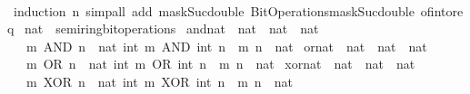 \begin{isabellebody}
%
\isadelimproof
\ \ %
\endisadelimproof
%
\isatagproof
{}\isamarkupfalse%
\ {\isacharparenleft}{\kern0pt}induction\ n{\isacharparenright}{\kern0pt}\ {\isacharparenleft}{\kern0pt}simp{\isacharunderscore}{\kern0pt}all\ add{\isacharcolon}{\kern0pt}\ mask{\isacharunderscore}{\kern0pt}Suc{\isacharunderscore}{\kern0pt}double\ Bit{\isacharunderscore}{\kern0pt}Operations{\isachardot}{\kern0pt}mask{\isacharunderscore}{\kern0pt}Suc{\isacharunderscore}{\kern0pt}double\ of{\isacharunderscore}{\kern0pt}int{\isacharunderscore}{\kern0pt}or{\isacharunderscore}{\kern0pt}eq{\isacharparenright}{\kern0pt}%
\endisatagproof
{\isafoldproof}%
%
\isadelimproof
\isanewline
%
\endisadelimproof
\isanewline
{}\isamarkupfalse%
%
\isadelimdocument
%
\endisadelimdocument
%
\isatagdocument
%
\isamarkuptrue%
%
\endisatagdocument
{\isafolddocument}%
%
\isadelimdocument
%
\endisadelimdocument
{}\isamarkupfalse%
\ nat\ {\isacharcolon}{\kern0pt}{\isacharcolon}{\kern0pt}\ semiring{\isacharunderscore}{\kern0pt}bit{\isacharunderscore}{\kern0pt}operations\isanewline
{}\isanewline
\isanewline
{}\isamarkupfalse%
\ and{\isacharunderscore}{\kern0pt}nat\ {\isacharcolon}{\kern0pt}{\isacharcolon}{\kern0pt}\ {\isacartoucheopen}nat\ {\isasymRightarrow}\ nat\ {\isasymRightarrow}\ nat{\isacartoucheclose}\isanewline
\ \ \ {\isacartoucheopen}m\ AND\ n\ {\isacharequal}{\kern0pt}\ nat\ {\isacharparenleft}{\kern0pt}int\ m\ AND\ int\ n{\isacharparenright}{\kern0pt}{\isacartoucheclose}\ \ m\ n\ {\isacharcolon}{\kern0pt}{\isacharcolon}{\kern0pt}\ nat\isanewline
\isanewline
{}\isamarkupfalse%
\ or{\isacharunderscore}{\kern0pt}nat\ {\isacharcolon}{\kern0pt}{\isacharcolon}{\kern0pt}\ {\isacartoucheopen}nat\ {\isasymRightarrow}\ nat\ {\isasymRightarrow}\ nat{\isacartoucheclose}\isanewline
\ \ \ {\isacartoucheopen}m\ OR\ n\ {\isacharequal}{\kern0pt}\ nat\ {\isacharparenleft}{\kern0pt}int\ m\ OR\ int\ n{\isacharparenright}{\kern0pt}{\isacartoucheclose}\ \ m\ n\ {\isacharcolon}{\kern0pt}{\isacharcolon}{\kern0pt}\ nat\isanewline
\isanewline
{}\isamarkupfalse%
\ xor{\isacharunderscore}{\kern0pt}nat\ {\isacharcolon}{\kern0pt}{\isacharcolon}{\kern0pt}\ {\isacartoucheopen}nat\ {\isasymRightarrow}\ nat\ {\isasymRightarrow}\ nat{\isacartoucheclose}\isanewline
\ \ \ {\isacartoucheopen}m\ XOR\ n\ {\isacharequal}{\kern0pt}\ nat\ {\isacharparenleft}{\kern0pt}int\ m\ XOR\ int\ n{\isacharparenright}{\kern0pt}{\isacartoucheclose}\ \ m\ n\ {\isacharcolon}{\kern0pt}{\isacharcolon}{\kern0pt}\ nat\isanewline

\end{isabellebody}
